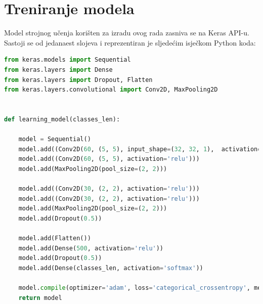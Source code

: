 \documentclass[times, utf8, zavrsni]{fer}
\begin{document}
\section{Treniranje modela}
Model strojnog učenja korišten za izradu ovog rada zasniva se na Keras API-u.
Sastoji se od jedanaest slojeva i reprezentiran je sljedećim isječkom Python koda:
\begin{lstlisting}[language=Python]
from keras.models import Sequential
from keras.layers import Dense
from keras.layers import Dropout, Flatten
from keras.layers.convolutional import Conv2D, MaxPooling2D


def learning_model(classes_len):

    model = Sequential()
    model.add((Conv2D(60, (5, 5), input_shape=(32, 32, 1),  activation='relu')))
    model.add((Conv2D(60, (5, 5), activation='relu')))
    model.add(MaxPooling2D(pool_size=(2, 2)))

    model.add((Conv2D(30, (2, 2), activation='relu')))
    model.add((Conv2D(30, (2, 2), activation='relu')))
    model.add(MaxPooling2D(pool_size=(2, 2)))
    model.add(Dropout(0.5))

    model.add(Flatten())
    model.add(Dense(500, activation='relu'))
    model.add(Dropout(0.5))
    model.add(Dense(classes_len, activation='softmax'))

    model.compile(optimizer='adam', loss='categorical_crossentropy', metrics=['accuracy'])
    return model
\end{lstlisting}
\end{document}
